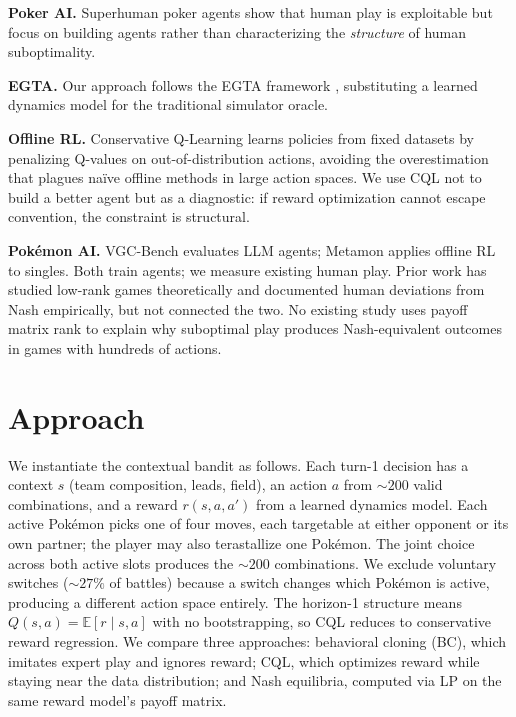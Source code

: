 \documentclass{article}
\begin{document}
\textbf{Poker AI.}
Superhuman poker agents \citep{bowling2015heads, brown2019superhuman} show that human play is exploitable but focus on building agents rather than characterizing the \emph{structure} of human suboptimality.

\textbf{EGTA.}
Our approach follows the EGTA framework \citep{wellman2006methods}, substituting a learned dynamics model for the traditional simulator oracle.

\textbf{Offline RL.}
Conservative Q-Learning \citep{kumar2020conservative} learns policies from fixed datasets by penalizing Q-values on out-of-distribution actions, avoiding the overestimation that plagues na\"ive offline methods in large action spaces. We use CQL not to build a better agent but as a diagnostic: if reward optimization cannot escape convention, the constraint is structural.

\textbf{Pok\'emon AI.}
VGC-Bench \citep{angliss2025vgcbench} evaluates LLM agents; Metamon \citep{grigsby2025metamon} applies offline RL to singles. Both train agents; we measure existing human play. Prior work has studied low-rank games theoretically and documented human deviations from Nash empirically, but not connected the two. No existing study uses payoff matrix rank to explain why suboptimal play produces Nash-equivalent outcomes in games with hundreds of actions.

\section{Approach}
\label{sec:approach}
We instantiate the contextual bandit as follows. Each turn-1 decision has a
context $s$ (team composition, leads, field), an action $a$ from
${\sim}200$ valid combinations, and a reward $r(s,a,a')$ from a learned
dynamics model. Each active Pok\'emon picks one of four moves, each targetable at either opponent or its own partner; the player may also terastallize one Pok\'emon. The joint choice across both active slots produces the ${\sim}200$ combinations. We exclude voluntary switches (${\sim}27\%$ of battles) because a switch changes which Pok\'emon is active, producing a different action space entirely. The horizon-1 structure means $Q(s,a) =
\mathbb{E}[r \mid s, a]$ with no bootstrapping, so CQL reduces to
conservative reward regression. We compare three approaches: behavioral
cloning (BC), which imitates expert play and ignores reward; CQL, which
optimizes reward while staying near the data distribution; and Nash
equilibria, computed via LP on the same reward model's payoff matrix.
\end{document}
